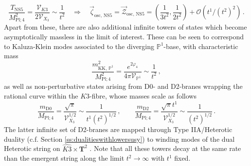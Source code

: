 %
\begin{equation}\label{eq:NS5vector}
	\frac{T_{\text{NS5}}}{M_{\text{Pl;}\, 4}^2} = \frac{\mathcal{V}_{K3}}{ 2 \mathcal{V}_{X_3}} \sim \frac{1}{t^2} \quad \Longrightarrow \quad \vec{\zeta}_{\text{osc, NS5}} = \vec{\mathcal{Z}}_{\text{osc, NS5}} = \left( \frac{1}{3t^2}, \frac{1}{2 t^2} \right) + \mathcal{O}\left( t^1/(t^2)^2\right)\, .
\end{equation}
%
%
%
Apart from these, there are also additional infinite towers of states which become asymptotically massless in the limit of interest. These can be seen to correspond to Kaluza-Klein modes associated to the diverging $\mathbb{P}^1$-base, with characteristic mass
%
\begin{equation}\label{eq:KKP1scale}
	\frac{m^2_{\text{KK}, \, \mathbb{P}^1}}{M_{\text{Pl;}\, 4}^2} = \frac{e^{2\varphi_4}}{4 \pi \mathcal{V}_{\mathbb{P}^1}} \sim \frac{1}{t^2}\, ,
\end{equation}
%
as well as non-perturbative states arising from D0- and D2-branes wrapping the rational curve within the $K3$-fibre, %
whose masses scale as follows
%
\begin{equation}\label{eq:D0D2emergenthet}
	\frac{m_{\text{D0}}}{M_{\text{Pl;}\, 4}} = \frac{\sqrt{\pi}}{\mathcal{V}_{X_3}^{1/2}}\sim \frac{1}{t^1 (t^2)^{1/2}}\, , \qquad \frac{m_{\text{D2}}}{M_{\text{Pl;}\, 4}} = \frac{\sqrt{\pi} t^1}{\mathcal{V}_{X_3}^{1/2}}\sim \frac{1}{(t^2)^{1/2}}\, .
\end{equation}
%
%
%
The latter infinite set of D2-branes are mapped through Type IIA/Heterotic duality (c.f. Section \ref{ss:dualitieswithlowersusy}) to winding modes of the dual Heterotic string on $\widehat{K3} \times \mathbf{T}^2$ \cite{Harvey:1995fq, Kawai:1996te}. Note that all these towers decay at the same rate than the emergent string along the limit $t^2\to \infty$ with $t^1$ fixed.
	
